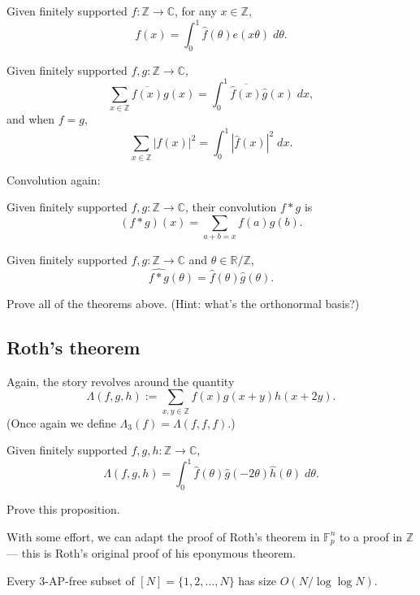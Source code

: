 \documentclass[10pt]{scrartcl}
\providecommand{\ol}{\overline}
\providecommand{\CC}{\mathbb C}
\providecommand{\FF}{\mathbb F}
\providecommand{\RR}{\mathbb R}
\providecommand{\ZZ}{\mathbb Z}
\providecommand{\dif}{\;d}
\renewcommand{\hat}{\widehat}
\begin{document}
\begin{theorem}
	Given finitely supported $f\colon\ZZ\to\CC$, for any $x\in\ZZ$,
	\[f(x) = \int_0^1 \hat f(\theta)e(x\theta)\dif\theta.\]
\end{theorem}

\begin{theorem}
	Given finitely supported $f,g\colon\ZZ\to\CC$,
	\[\sum_{x\in\ZZ}\ol{f(x)}g(x) = \int_0^1\ol{\hat f(x)}\hat g(x)\dif x,\]
	and when $f=g$,
	\[\sum_{x\in\ZZ}|f(x)|^2 = \int_0^1 |\hat f(x)|^2\dif x.\]
\end{theorem}

Convolution again:
\begin{definition}[Convolution]
	Given finitely supported $f,g\colon\ZZ\to\CC$, their convolution $f*g$ is
	\[(f*g)(x) = \sum_{a+b=x} f(a)g(b).\]
\end{definition}

\begin{theorem}
	Given finitely supported $f,g\colon\ZZ\to\CC$ and $\theta\in\RR/\ZZ$,
	\[\hat{f*g}(\theta) = \hat f(\theta)\hat g(\theta).\]
\end{theorem}

\begin{exercise}
	Prove all of the theorems above.
	(Hint: what's the orthonormal basis?)
\end{exercise}

\subsection{Roth's theorem}

Again, the story revolves around the quantity
\[\Lambda(f,g,h) := \sum_{x,y\in\ZZ} f(x)g(x+y)h(x+2y).\]
(Once again we define $\Lambda_3(f) = \Lambda(f,f,f)$.)
\begin{prop}
	Given finitely supported $f,g,h\colon\ZZ\to\CC$,
	\[\Lambda(f,g,h) =
	\int_0^1 \hat f(\theta)\hat g(-2\theta)\hat h(\theta)\dif\theta.\]
\end{prop}

\begin{exercise}
	Prove this proposition.
\end{exercise}

With some effort, we can adapt the proof of Roth's theorem in $\FF_p^n$
to a proof in $\ZZ$ --- this is Roth's original proof of his eponymous theorem.

\begin{theorem}
	Every 3-AP-free subset of $[N] = \{1,2,\dots,N\}$ has size
	$O(N/\log\log N)$.
\end{theorem}
\end{document}
